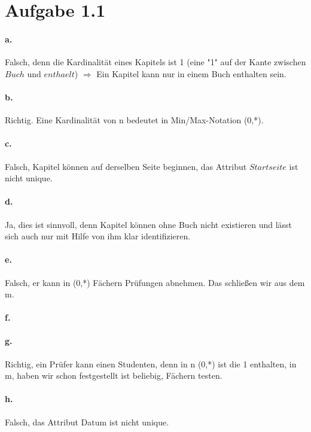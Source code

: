 \documentclass{article}
\begin{document}
	
	
	
	
	\section*{Aufgabe 1.1}
		\paragraph*{a.} Falsch, denn die Kardinalität eines Kapitels ist 1 (eine "1" auf der Kante zwischen $Buch$ und $enthaelt$) $\Rightarrow$ Ein Kapitel kann nur in einem Buch enthalten sein.
		
		\paragraph*{b.} Richtig. Eine Kardinalität von n bedeutet in Min/Max-Notation (0,*).
		
		\paragraph*{c.} Falsch, Kapitel können auf derselben Seite beginnen, das Attribut $Startseite$ ist nicht unique.
		
		\paragraph*{d.} Ja, dies ist sinnvoll, denn Kapitel können ohne Buch nicht existieren und lässt sich auch nur mit Hilfe von ihm klar identifizieren.
		
		\paragraph*{e.}Falsch, er kann in (0,*) Fächern Prüfungen abnehmen. Das schließen wir aus dem m.
		
		\paragraph*{f.}
		
		\paragraph*{g.}Richtig, ein Prüfer kann einen Studenten, denn in n (0,*) ist die 1 enthalten, in m, haben wir schon festgestellt ist beliebig, Fächern testen. 
		
		\paragraph*{h.}Falsch, das Attribut Datum ist nicht unique.
		
\end{document}
